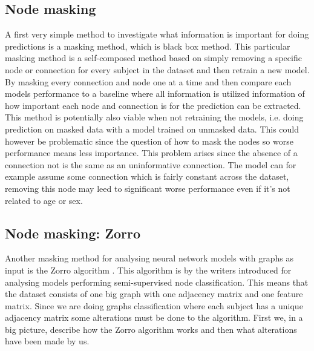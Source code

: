 \subsection{Node masking}
A first very simple method to investigate what information is important  for doing predictions is a masking method, which is black box method. This particular masking method is a self-composed method based on simply removing a specific node or connection for every subject in the dataset and then retrain a new model. By masking every connection and node one at a time and then compare each models performance to a baseline where all information is utilized information of how important each node and connection is for the prediction can be extracted. This method is potentially also viable when not retraining the models, i.e. doing prediction on masked data with a model trained on unmasked data. This could however be problematic since the question of how to mask the nodes so worse performance means less importance. This problem arises since the absence of a connection not is the same as an uninformative connection. The model can for example assume some connection which is fairly constant across the dataset, removing this node may leed to significant worse performance even if it's not related to age or sex.

\subsection{Node masking: Zorro}
Another masking method for analysing neural network models with graphs as input is the Zorro algorithm \cite{}. This algorithm is by the writers introduced for analysing models performing semi-supervised node classification. This means that the dataset consists of one big graph with one adjacency matrix and one feature matrix. Since we are doing graphs classification where each subject has a unique adjacency matrix some alterations must be done to the algorithm. First we, in a big picture, describe how the Zorro algorithm works and then what alterations have been made by us.

